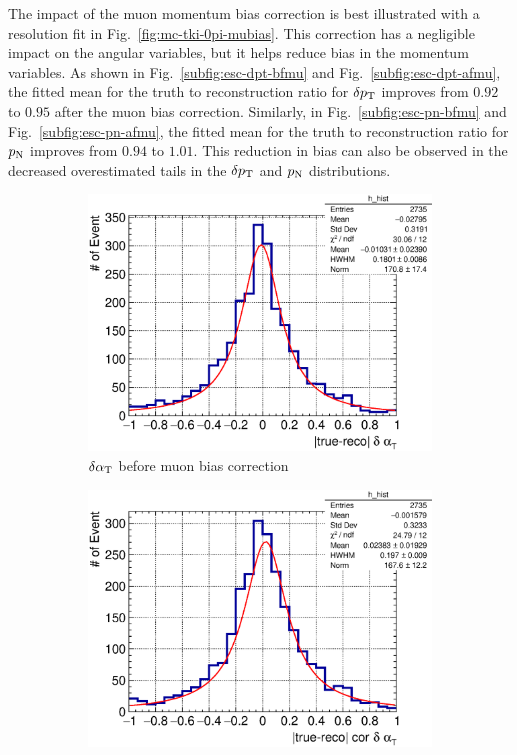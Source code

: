      The impact of the muon momentum bias correction is best illustrated with a resolution fit in Fig.~\ref{fig:mc-tki-0pi-mubias}.
     This correction has a negligible impact on the angular variables, but it helps reduce bias in the momentum variables.
     As shown in Fig.~\ref{subfig:esc-dpt-bfmu} and Fig.~\ref{subfig:esc-dpt-afmu}, the fitted mean for the truth to reconstruction ratio for $\delta p_\textrm{T}$ improves from $0.92$ to $0.95$ after the muon bias correction.
     Similarly, in Fig.~\ref{subfig:esc-pn-bfmu} and Fig.~\ref{subfig:esc-pn-afmu}, the fitted mean for the truth to reconstruction ratio for $p_\textrm{N}$ improves from $0.94$ to $1.01$.
     This reduction in bias can also be observed in the decreased overestimated tails in the $\delta p_\textrm{T}$ and $p_\textrm{N}$ distributions.
     \begin{figure}
          \begin{subfigure}[b]{\dbfigwid\textwidth}
               \centering
               \includegraphics[width=\textwidth]{figures/perf/tki/dalphat_rat_hist_al14.eps}
               \caption{$\delta\alpha_\textrm{T}$ before muon bias correction}
               \label{subfig:esc-dalpha-bfmu}
          \end{subfigure}         
          \begin{subfigure}[b]{\dbfigwid\textwidth}
               \centering
               \includegraphics[width=\textwidth]{figures/perf/tki/cor_dalphat_rat_hist_al14.eps}

\end{subfigure}
\end{figure}
